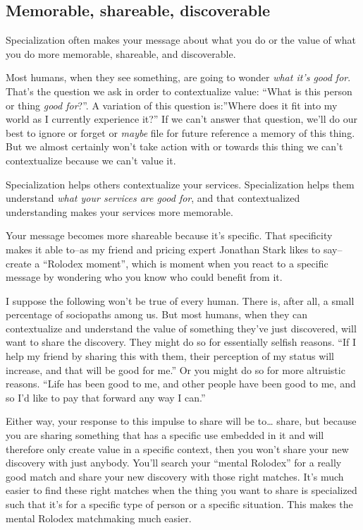 \subsection{Memorable, shareable, discoverable}

Specialization often makes your message about what you do or the value of what you do more memorable, shareable, and discoverable.

Most humans, when they see something, are going to wonder \emph{what it's good for}. That's the question we ask in order to contextualize value: ``What is this person or thing \emph{good for}?''. A variation of this question is:''Where does it fit into my world as I currently experience it?'' If we can't answer that question, we'll do our best to ignore or forget or \emph{maybe} file for future reference a memory of this thing. But we almost certainly won't take action with or towards this thing we can't contextualize because we can't value it.

Specialization helps others contextualize your services. Specialization helps  them understand \emph{what your services are good for}, and that contextualized understanding makes your services more memorable.

Your message becomes more shareable because it's specific. That specificity makes it able to--as my friend and pricing expert Jonathan Stark likes to say--create a ``Rolodex moment'', which is moment when you react to a specific message by wondering who you know who could benefit from it.

I suppose the following won't be true of every human. There is, after all, a small percentage of sociopaths among us. But most humans, when they can contextualize and understand the value of something they've just discovered, will want to share the discovery. They might do so for essentially selfish reasons. ``If I help my friend by sharing this with them, their perception of my status will increase, and that will be good for me.'' Or you might do so for more altruistic reasons. ``Life has been good to me, and other people have been good to me, and so I'd like to pay that forward any way I can.''

Either way, your response to this impulse to share will be to\ldots{} share, but because you are sharing something that has a specific use embedded in it and will therefore only create value in a specific context, then you won't share your new discovery with just anybody. You'll search your ``mental Rolodex'' for a really good match and share your new discovery with those right matches. It's much easier to find these right matches when the thing you want to share is specialized such that it's for a specific type of person or a specific situation. This makes the mental Rolodex matchmaking much easier.

